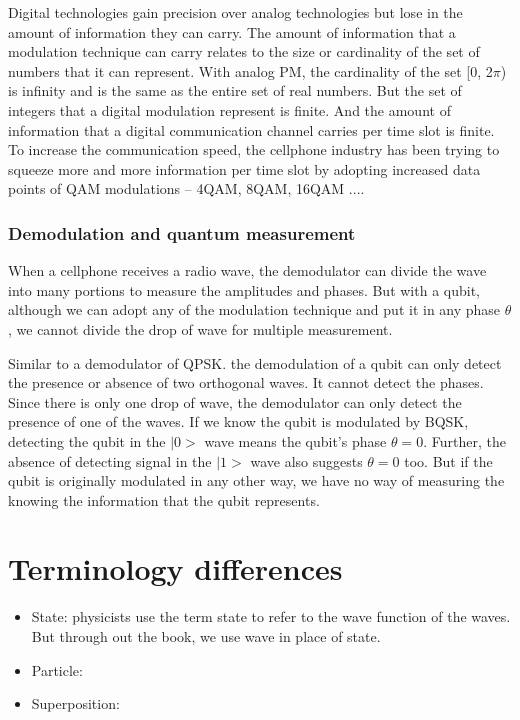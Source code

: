 \documentclass{book}
\begin{document}
Digital technologies gain precision over analog technologies but lose in the amount of information they can carry. The amount of information that a modulation technique can carry relates to the size or cardinality of the set of numbers that it can represent. With analog PM, the cardinality of the set [0, 2$\pi$) is infinity and is the same as the entire set of real numbers. But the set of integers that a digital modulation represent is finite. And the amount of information that a digital communication channel carries per time slot is finite. To increase the communication speed, the cellphone industry has been trying to squeeze more and more information per time slot by adopting increased data points of QAM modulations -- 4QAM, 8QAM, 16QAM ....

\subsubsection{Demodulation and quantum measurement}
When a cellphone receives a radio wave, the demodulator can divide the wave into many portions to measure the amplitudes and phases. But with a qubit, although we can adopt any of the modulation technique and put it in any phase $\theta$, we cannot divide the drop of wave for multiple measurement.

Similar to a demodulator of QPSK. the demodulation of a qubit can only detect the presence or absence of two orthogonal waves. It cannot detect the phases. Since there is only one drop of wave, the demodulator can only detect the presence of one of the waves. If we know the qubit is modulated by BQSK, detecting the qubit in the $|0>$ wave means the qubit's phase $\theta = 0$. Further, the absence of detecting signal in the $|1>$ wave also suggests $\theta = 0$ too. But if the qubit is originally modulated in any other way, we have no way of measuring the knowing the information that the qubit represents.

\section{Terminology differences}
\begin{itemize}
    \item State: physicists use the term state to refer to the wave function of the waves. But through out the book, we use wave in place of state.
    \item Particle: 
    \item Superposition:
\end{itemize}
\end{document}
